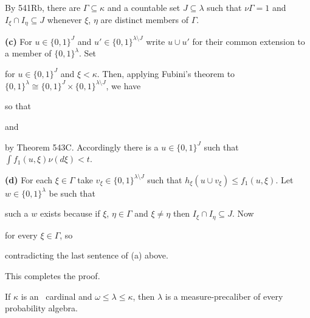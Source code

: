{By 541Rb, there are $\Gamma\subseteq\kappa$ and a countable set
$J\subseteq\lambda$ such
that $\nu\Gamma=1$ and $I_{\xi}\cap I_{\eta}\subseteq J$
whenever $\xi$, $\eta$ are distinct members of $\Gamma$.

\medskip

{\bf (c)} For $u\in\{0,1\}^J$ and $u'\in\{0,1\}^{\lambda\setminus J}$ write
$u\cup u'$ for their common extension to a member of
$\{0,1\}^\lambda$.   Set


\noindent for $u\in\{0,1\}^J$ and $\xi<\kappa$.   Then, applying
Fubini's theorem to
$\{0,1\}^{\lambda}\cong\{0,1\}^J\times\{0,1\}^{\lambda\setminus J}$,
we have


\noindent  so that


\noindent and


\noindent by Theorem 543C.   Accordingly there is a $u\in\{0,1\}^J$
such that $\int f_1(u,\xi)\nu(d\xi)<t$.

\medskip

{\bf (d)} For each $\xi\in\Gamma$ take
$v_{\xi}\in\{0,1\}^{\lambda\setminus J}$ such that
$h_{\xi}(u\cup v_{\xi})\le f_1(u,\xi)$.
Let $w\in\{0,1\}^{\lambda}$ be such that


\noindent such a $w$ exists because if $\xi$, $\eta\in\Gamma$
and $\xi\ne\eta$ then $I_{\xi}\cap I_{\eta}\subseteq J$.   Now


\noindent for every $\xi\in\Gamma$, so


\noindent contradicting the last sentence of (a) above.\ \Bang

This completes the proof.
}%

 If $\kappa$ is an \am\ cardinal and
$\omega\le\lambda\le\kappa$, then $\lambda$ is a measure-precaliber
of every probability algebra.

